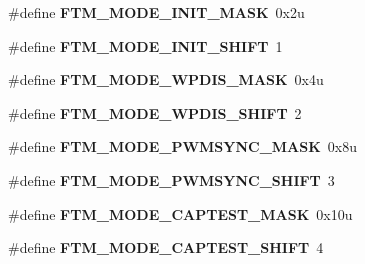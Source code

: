 \begin{DoxyCompactItemize}
\item 
\#define {\bfseries F\+T\+M\+\_\+\+M\+O\+D\+E\+\_\+\+I\+N\+I\+T\+\_\+\+M\+A\+SK}~0x2u\hypertarget{group__FTM__Register__Masks_ga069f8d36fce3b99bf22cf8e588b855bf}{}\label{group__FTM__Register__Masks_ga069f8d36fce3b99bf22cf8e588b855bf}

\item 
\#define {\bfseries F\+T\+M\+\_\+\+M\+O\+D\+E\+\_\+\+I\+N\+I\+T\+\_\+\+S\+H\+I\+FT}~1\hypertarget{group__FTM__Register__Masks_ga0d0d007a2359f31a0cf50b06acef810c}{}\label{group__FTM__Register__Masks_ga0d0d007a2359f31a0cf50b06acef810c}

\item 
\#define {\bfseries F\+T\+M\+\_\+\+M\+O\+D\+E\+\_\+\+W\+P\+D\+I\+S\+\_\+\+M\+A\+SK}~0x4u\hypertarget{group__FTM__Register__Masks_ga1178ceaccafa6eb9f10395901c75f7ba}{}\label{group__FTM__Register__Masks_ga1178ceaccafa6eb9f10395901c75f7ba}

\item 
\#define {\bfseries F\+T\+M\+\_\+\+M\+O\+D\+E\+\_\+\+W\+P\+D\+I\+S\+\_\+\+S\+H\+I\+FT}~2\hypertarget{group__FTM__Register__Masks_ga36fb0f391d4b52f38caf711ba8d73ae7}{}\label{group__FTM__Register__Masks_ga36fb0f391d4b52f38caf711ba8d73ae7}

\item 
\#define {\bfseries F\+T\+M\+\_\+\+M\+O\+D\+E\+\_\+\+P\+W\+M\+S\+Y\+N\+C\+\_\+\+M\+A\+SK}~0x8u\hypertarget{group__FTM__Register__Masks_ga3993337287da1b6624d5f7d70f10b3d5}{}\label{group__FTM__Register__Masks_ga3993337287da1b6624d5f7d70f10b3d5}

\item 
\#define {\bfseries F\+T\+M\+\_\+\+M\+O\+D\+E\+\_\+\+P\+W\+M\+S\+Y\+N\+C\+\_\+\+S\+H\+I\+FT}~3\hypertarget{group__FTM__Register__Masks_ga5e9f1c44632b559046173b3b0db93170}{}\label{group__FTM__Register__Masks_ga5e9f1c44632b559046173b3b0db93170}

\item 
\#define {\bfseries F\+T\+M\+\_\+\+M\+O\+D\+E\+\_\+\+C\+A\+P\+T\+E\+S\+T\+\_\+\+M\+A\+SK}~0x10u\hypertarget{group__FTM__Register__Masks_ga24f1ea5d7afd4ec88404e4867303aae5}{}\label{group__FTM__Register__Masks_ga24f1ea5d7afd4ec88404e4867303aae5}

\item 
\#define {\bfseries F\+T\+M\+\_\+\+M\+O\+D\+E\+\_\+\+C\+A\+P\+T\+E\+S\+T\+\_\+\+S\+H\+I\+FT}~4\hypertarget{group__FTM__Register__Masks_gab95eb2088da81d610805b949399d9bf9}{}\label{group__FTM__Register__Masks_gab95eb2088da81d610805b949399d9bf9}


\end{DoxyCompactItemize}
